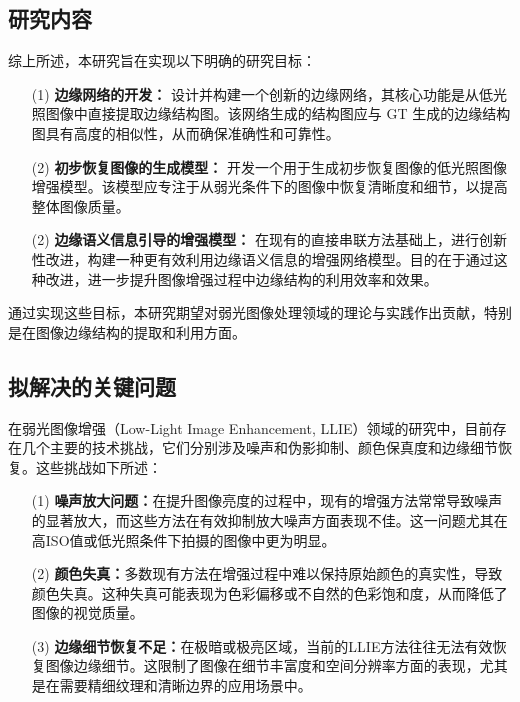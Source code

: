 \documentclass[a4paper]{ctexart}
\begin{document}
	\subsection{研究内容}
	
	综上所述，本研究旨在实现以下明确的研究目标：
	
	\begin{itemize}
		\item [(1)] \textbf{边缘网络的开发：} 设计并构建一个创新的边缘网络，其核心功能是从低光照图像中直接提取边缘结构图。该网络生成的结构图应与 GT 生成的边缘结构图具有高度的相似性，从而确保准确性和可靠性。
		
		\item [(2)] \textbf{初步恢复图像的生成模型：} 开发一个用于生成初步恢复图像的低光照图像增强模型。该模型应专注于从弱光条件下的图像中恢复清晰度和细节，以提高整体图像质量。
		
		\item [(2)] \textbf{边缘语义信息引导的增强模型：} 在现有的直接串联方法基础上，进行创新性改进，构建一种更有效利用边缘语义信息的增强网络模型。目的在于通过这种改进，进一步提升图像增强过程中边缘结构的利用效率和效果。
	\end{itemize}
	
	通过实现这些目标，本研究期望对弱光图像处理领域的理论与实践作出贡献，特别是在图像边缘结构的提取和利用方面。
	
	\subsection{拟解决的关键问题}
	
	在弱光图像增强（Low-Light Image Enhancement, LLIE）领域的研究中，目前存在几个主要的技术挑战，它们分别涉及噪声和伪影抑制、颜色保真度和边缘细节恢复。这些挑战如下所述：
	
	\begin{itemize}
		\item [(1)]
		\textbf{噪声放大问题：}在提升图像亮度的过程中，现有的增强方法常常导致噪声的显著放大，而这些方法在有效抑制放大噪声方面表现不佳。这一问题尤其在高ISO值或低光照条件下拍摄的图像中更为明显。
		\item [(2)]
		\textbf{颜色失真：}多数现有方法在增强过程中难以保持原始颜色的真实性，导致颜色失真。这种失真可能表现为色彩偏移或不自然的色彩饱和度，从而降低了图像的视觉质量。
		
		\item [(3)]
		\textbf{边缘细节恢复不足：}在极暗或极亮区域，当前的LLIE方法往往无法有效恢复图像边缘细节。这限制了图像在细节丰富度和空间分辨率方面的表现，尤其是在需要精细纹理和清晰边界的应用场景中。
		
	\end{itemize}
\end{document}
